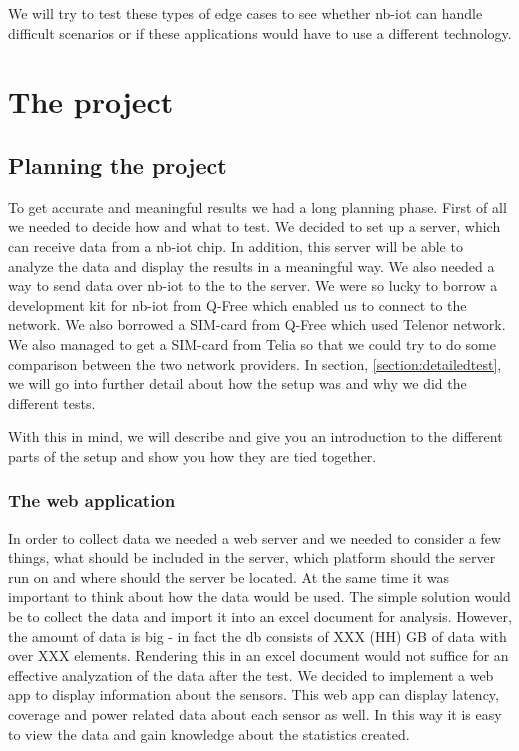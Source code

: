 \documentclass[USenglish]{ifimaster}  %
\begin{document}
We will try to test these types of edge cases to see whether \acrshort{nb-iot} can handle difficult scenarios or if these applications would have to use a different technology.

\part{The project}
\chapter{Planning the project}
To get accurate and meaningful results we had a long planning phase. First of all we needed to decide how and what to test. We decided to set up a server, which can receive data from a \acrshort{nb-iot} chip. In addition, this server will be able to analyze the data and display the results in a meaningful way. We also needed a way to send data over \acrshort{nb-iot} to the to the server. We were so lucky to borrow a development kit for \acrshort{nb-iot} from Q-Free which enabled us to connect to the network. We also borrowed a SIM-card from Q-Free which used Telenor network. We also managed to get a SIM-card from Telia so that we could try to do some comparison between the two network providers. In section, \vref{section:detailedtest}, we will go into further detail about how the setup was and why we did the different tests.

With this in mind, we will describe and give you an introduction to the different parts of the setup and show you how they are tied together.

\section{The web application}
In order to collect data we needed a web server and we needed to consider a few things, what should be included in the server, which platform should the server run on and where should the server be located. At the same time it was important to think about how the data would be used. The simple solution would be to collect the data and import it into an excel document for analysis. However, the amount of data is big - in fact the db consists of XXX (HH) GB of data with over XXX elements. Rendering this in an excel document would not suffice for an effective analyzation of the data after the test. We decided to implement a web app to display information about the sensors. This web app can display latency, coverage and power related data about each sensor as well. In this way it is easy to view the data and gain knowledge about the statistics created.
\end{document}

